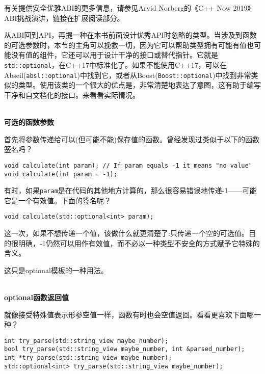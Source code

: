 有关提供安全优雅ABI的更多信息，请参见Arvid Norberg的《C++ Now 2019》ABI挑战演讲，链接在扩展阅读部分。


从ABI回到API，再提一种在本书前面设计优秀API时忽略的类型。当涉及到函数的可选参数时，本节的主角可以挽救一切，因为它可以帮助类型拥有可能有值也可能没有值的组件，它还可以用于设计干净的接口或替代指针。它就是\texttt{std::optional}，在C++17中标准化了。如果不能使用C++17，可以在Abseil(\texttt{absl::optional})中找到它，或者从Boost(\texttt{Boost::optional})中找到非常类似的类型。使用该类的一个很大的优点是，非常清楚地表达了意图，这有助于编写干净和自文档化的接口。来看看实际情况。

\hspace*{\fill} \\ %
\noindent
\textbf{可选的函数参数}

首先将参数传递给可以(但可能不能)保存值的函数。曾经发现过类似于以下的函数签名吗？

\begin{lstlisting}[style=styleCXX]
void calculate(int param); // If param equals -1 it means "no value"
void calculate(int param = -1);
\end{lstlisting}

有时，如果\texttt{param}是在代码的其他地方计算的，那么很容易错误地传递-1——可能它是一个有效值。下面的签名呢？

\begin{lstlisting}[style=styleCXX]
void calculate(std::optional<int> param);
\end{lstlisting}

这一次，如果不想传递一个值，该做什么就更清楚了:只传递一个空的可选值。目的很明确，-1仍然可以用作有效值，而不必以一种类型不安全的方式赋予它特殊的含义。

这只是optional模板的一种用法。

\hspace*{\fill} \\ %
\noindent
\textbf{optional函数返回值}

就像接受特殊值表示形参空值一样，函数有时也会空值返回。看看更喜欢下面哪一种？

\begin{lstlisting}[style=styleCXX]
int try_parse(std::string_view maybe_number);
bool try_parse(std::string_view maybe_number, int &parsed_number);
int *try_parse(std::string_view maybe_number);
std::optional<int> try_parse(std::string_view maybe_number);
\end{lstlisting}

